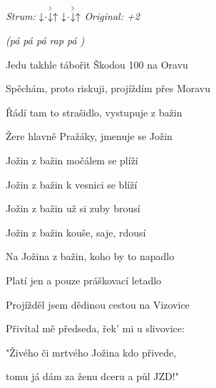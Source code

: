 \begin{song}


 \quad
\textit{Strum:} $\Down\Miss\AccentDown\Up\ \Down\Miss\AccentDown\Up$ \quad
\textit{Original: +2}

\large

\begin{chordbox}
\par
{}\par
{}\par
{}\par
{}\par
{}\par
\end{chordbox}

\Large

\bigskip

 \textit{(pá pá pá rap pá )} \par
{}Jedu takhle tábořit Škodou 100 na Oravu \par
{}Spěchám, proto riskuji, projíždím přes Moravu \par
{}Řádí tam to strašidlo, vystupuje z bažin \par
{}Žere hlavně Pražáky, jmenuje se Jožin \par

\bigskip

\begin{chorusbox}
 \par
{}Jožin z bažin močálem se plíží \par
{}Jožin z bažin k vesnici se blíží \par
{}Jožin z bažin už si zuby brousí \par
{}Jožin z bažin kouše, saje, rdousí \par
{}Na Jožina z bažin, koho by to napadlo  \par
{}Platí jen a pouze práškovací letadlo  \par
\end{chorusbox}

\bigskip

 \par
{}Projížděl jsem dědinou cestou na Vizovice \par
{}Přivítal mě předseda, řek' mi u slivovice: \par
{}"Živého či mrtvého Jožina kdo přivede, \par
{}tomu já dám za ženu dceru a půl JZD!" \par



\end{song}

